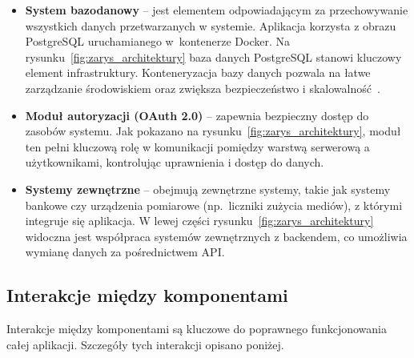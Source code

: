 \begin{itemize}
    \item \textbf{System bazodanowy} -- jest elementem odpowiadającym za przechowywanie wszystkich danych przetwarzanych w systemie. Aplikacja korzysta z obrazu PostgreSQL uruchamianego w~kontenerze Docker. Na rysunku~\ref{fig:zarys_architektury} baza danych PostgreSQL stanowi kluczowy element infrastruktury. Konteneryzacja bazy danych pozwala na łatwe zarządzanie środowiskiem oraz zwiększa bezpieczeństwo i skalowalność~\cite{Docker-docs,vsupalov}.

    \item \textbf{Moduł autoryzacji (OAuth 2.0)} -- zapewnia bezpieczny dostęp do zasobów systemu. Jak pokazano na rysunku~\ref{fig:zarys_architektury}, moduł ten pełni kluczową rolę w komunikacji pomiędzy warstwą serwerową a użytkownikami, kontrolując uprawnienia i dostęp do danych.

    \item \textbf{Systemy zewnętrzne} -- obejmują zewnętrzne systemy, takie jak systemy bankowe czy urządzenia pomiarowe (np.\ liczniki zużycia mediów), z którymi integruje się aplikacja. W lewej części rysunku~\ref{fig:zarys_architektury} widoczna jest współpraca systemów zewnętrznych z backendem, co umożliwia wymianę danych za pośrednictwem API.
		
\end{itemize}  


\subsection{Interakcje między komponentami}
Interakcje między komponentami są kluczowe do poprawnego funkcjonowania całej aplikacji. Szczegóły tych interakcji opisano poniżej. 

